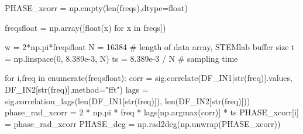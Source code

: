 \documentclass[
  ngerman,
  letterpaper,
  DIV=11]{scrreprt}
\newenvironment{Shaded}{}{}
\newcommand{\BuiltInTok}[1]{\textcolor[rgb]{0.84,0.23,0.29}{#1}}
\newcommand{\CommentTok}[1]{\textcolor[rgb]{0.42,0.45,0.49}{#1}}
\newcommand{\ControlFlowTok}[1]{\textcolor[rgb]{0.84,0.23,0.29}{#1}}
\newcommand{\DecValTok}[1]{\textcolor[rgb]{0.00,0.36,0.77}{#1}}
\newcommand{\FloatTok}[1]{\textcolor[rgb]{0.00,0.36,0.77}{#1}}
\newcommand{\KeywordTok}[1]{\textcolor[rgb]{0.84,0.23,0.29}{#1}}
\newcommand{\NormalTok}[1]{\textcolor[rgb]{0.14,0.16,0.18}{#1}}
\newcommand{\OperatorTok}[1]{\textcolor[rgb]{0.14,0.16,0.18}{#1}}
\newcommand{\StringTok}[1]{\textcolor[rgb]{0.01,0.18,0.38}{#1}}
\begin{document}
\begin{Shaded}
\begin{Highlighting}[]
\NormalTok{            PHASE\_xcorr }\OperatorTok{=}\NormalTok{ np.empty(}\BuiltInTok{len}\NormalTok{(freqs),dtype}\OperatorTok{=}\BuiltInTok{float}\NormalTok{)}

\NormalTok{            freqsfloat }\OperatorTok{=}\NormalTok{ np.array([}\BuiltInTok{float}\NormalTok{(x) }\ControlFlowTok{for}\NormalTok{ x }\KeywordTok{in}\NormalTok{ freqs])}

\NormalTok{            w }\OperatorTok{=} \DecValTok{2}\OperatorTok{*}\NormalTok{np.pi}\OperatorTok{*}\NormalTok{freqsfloat}
\NormalTok{            N }\OperatorTok{=} \DecValTok{16384}  \CommentTok{\# length of data array, STEMlab buffer size}
\NormalTok{            t }\OperatorTok{=}\NormalTok{ np.linspace(}\DecValTok{0}\NormalTok{, }\FloatTok{8.389e{-}3}\NormalTok{, N)}
\NormalTok{            ts }\OperatorTok{=} \FloatTok{8.389e{-}3} \OperatorTok{/}\NormalTok{ N  }\CommentTok{\# sampling time}


            \ControlFlowTok{for}\NormalTok{ i,freq }\KeywordTok{in} \BuiltInTok{enumerate}\NormalTok{(freqsfloat):}
\NormalTok{                corr }\OperatorTok{=}\NormalTok{ sig.correlate(DF\_IN1[}\BuiltInTok{str}\NormalTok{(freq)].values, DF\_IN2[}\BuiltInTok{str}\NormalTok{(freq)],method}\OperatorTok{=}\StringTok{"fft"}\NormalTok{)}
\NormalTok{                lags }\OperatorTok{=}\NormalTok{ sig.correlation\_lags(}\BuiltInTok{len}\NormalTok{(DF\_IN1[}\BuiltInTok{str}\NormalTok{(freq)]), }\BuiltInTok{len}\NormalTok{(DF\_IN2[}\BuiltInTok{str}\NormalTok{(freq)]))}
\NormalTok{                phase\_rad\_xcorr }\OperatorTok{=} \DecValTok{2} \OperatorTok{*}\NormalTok{ np.pi }\OperatorTok{*}\NormalTok{ freq }\OperatorTok{*}\NormalTok{ lags[np.argmax(corr)] }\OperatorTok{*}\NormalTok{ ts}
\NormalTok{                PHASE\_xcorr[i] }\OperatorTok{=}\NormalTok{ phase\_rad\_xcorr}
\NormalTok{            PHASE\_deg }\OperatorTok{=}\NormalTok{ np.rad2deg(np.unwrap(PHASE\_xcorr))}


\end{Highlighting}
\end{Shaded}
\end{document}
